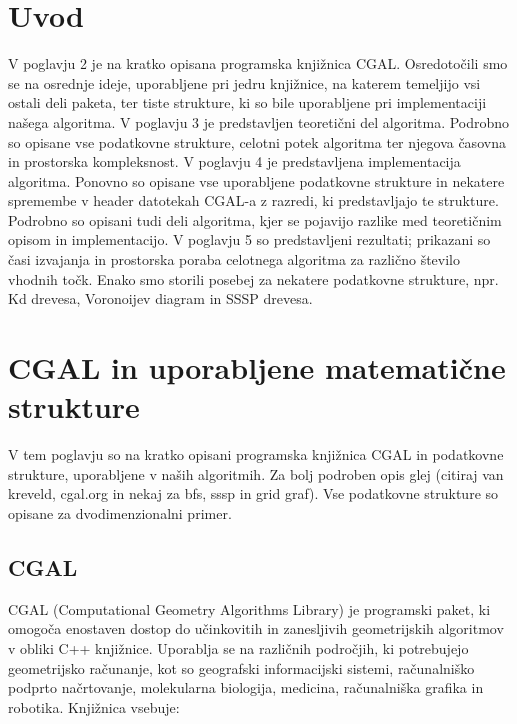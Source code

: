 \documentclass[a4paper, 12pt]{book}
\newcommand{\clearemptydoublepage}{\newpage{\pagestyle{empty}\cleardoublepage}}
\begin{document}
\mainmatter
\setcounter{page}{1}
\pagestyle{fancy}

\chapter{Uvod}
V poglavju 2 je na kratko opisana programska knjižnica CGAL. Osredotočili smo se na osrednje ideje, uporabljene pri jedru knjižnice, na katerem temeljijo vsi ostali deli paketa, ter tiste strukture, ki so bile uporabljene pri implementaciji našega algoritma. V poglavju 3 je predstavljen teoretični del algoritma. Podrobno so opisane vse podatkovne strukture, celotni potek algoritma ter njegova časovna in prostorska kompleksnost. V poglavju 4 je predstavljena implementacija algoritma. Ponovno so opisane vse uporabljene podatkovne strukture in nekatere spremembe v header datotekah CGAL-a z razredi, ki predstavljajo te strukture. Podrobno so opisani tudi deli algoritma, kjer se pojavijo razlike med teoretičnim opisom in implementacijo. V poglavju 5 so predstavljeni rezultati; prikazani so časi izvajanja in prostorska poraba celotnega algoritma za različno število vhodnih točk. Enako smo storili posebej za nekatere podatkovne strukture, npr. Kd drevesa, Voronoijev diagram in SSSP drevesa.

\clearemptydoublepage


\chapter{CGAL in uporabljene matematične strukture}
\label{ch1}

V tem poglavju so na kratko opisani programska knjižnica CGAL in podatkovne strukture, uporabljene v naših algoritmih. Za bolj podroben opis glej (citiraj van kreveld, cgal.org in nekaj za bfs, sssp in grid graf). Vse podatkovne strukture so opisane za dvodimenzionalni primer.
\section{CGAL}
CGAL (Computational Geometry Algorithms Library) je programski paket, ki omogoča enostaven dostop do učinkovitih in zanesljivih geometrijskih algoritmov v obliki C++ knjižnice. Uporablja se na različnih področjih, ki potrebujejo geometrijsko računanje, kot so geografski informacijski sistemi, računalniško podprto načrtovanje, molekularna biologija, medicina, računalniška grafika in robotika. Knjižnica vsebuje:
\end{document}

